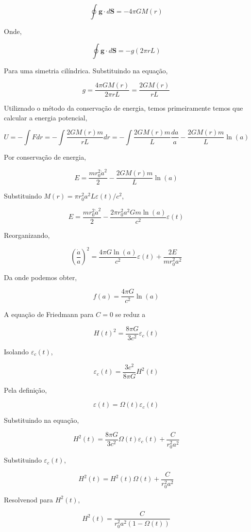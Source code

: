 \documentclass[11pt]{article}
\begin{document}
\begin{pproblem}
\begin{pssolution*}{}{}
\begin{alternativas}
        \[\oint\mathbf{g}\cdot d\mathbf{S} = -4\pi G M(r)\]

        Onde, 

        \[\oint \mathbf{g} \cdot d\mathbf{S} = -g(2\pi r L)\]

        Para uma simetria cilíndrica. Substituindo na equação, 

        \[g = \frac{4\pi G M(r)}{2\pi r L} = \frac{2G M(r)}{r L}\]

        Utiliznado o método da conservação de energia, temos primeiramente temos que calcular a energia potencial, 

        \[U = -\int F dr = -\int \frac{2GM(r)m}{rL}dr = -\int\frac{2GM(r)m}{L}\frac{da}{a} -\frac{2GM(r)m}{L}\ln(a)\]

        Por conservação de energia, 

        \[E = \frac{m r_0^2\dot{a}^2}{2} - \frac{2GM(r)m}{L}\ln(a)\]

        Substituindo \(M(r) = \pi r_0^2a^2 L \varepsilon(t)/c^2\), 

        \[E = \frac{m r_0^2 \dot{a}^2}{2} - \frac{2\pi r_0^2a^2G m \ln (a)}{c^2}\varepsilon(t)\]

        Reorganizando, 

        \[\left(\frac{\dot{a}}{a}\right)^2 = \frac{4\pi G \ln(a)}{c^2}\varepsilon(t) + \frac{2E}{mr_0^2a^2}\]

        Da onde podemos obter, 

        \[\boxed{f(a) = \frac{4\pi G}{c^2}\ln(a)}\]

        \item A equação de Friedmann para \(C=0\) se reduz a
        
        \[H(t)^2 = \frac{8\pi G}{3c^2}\varepsilon_c(t)\]

        Isolando \(\varepsilon_c(t)\), 

        \[\boxed{\varepsilon_c(t) = \frac{3c^2}{8\pi G}H^2(t)}\]

        Pela definição, 

        \[\varepsilon(t) = \Omega (t) \varepsilon_c(t)\]

        Substituindo na equação, 

        \[H^2(t) = \frac{8\pi G}{3c^2}\Omega(t)\varepsilon_c(t) + \frac{C}{r_0^2a^2}\]

        Substituindo \(\varepsilon_c(t)\), 

        \[H^2(t) = H^2(t)\Omega(t) + \frac{C}{r_0^2a^2}\]

        Resolvenod para \(H^2(t)\), 

        \[\boxed{H^2(t) = \frac{C}{r_0^2a^2(1-\Omega(t))}}\]
    \end{alternativas}
    
\end{pssolution*}
\end{pproblem}
\end{document}
